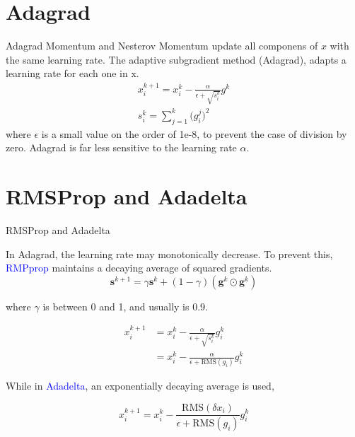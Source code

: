 \documentclass{beamer}
\begin{document}
\section{Adagrad}
\begin{frame}{Adagrad}
Momentum and Nesterov Momentum update all componens of $x$ with the same learning rate. The adaptive subgradient method (Adagrad), adapts a learning rate for each one in x.
\begin{gather*}
    x_i^{k+1} = x_i^k - \frac{\alpha}{\epsilon + \sqrt{s_i^k}} g^k \\
    s_i^k = \sum_{j=1}^k \bigg(g_i^j\bigg)^2 
\end{gather*}
where $\epsilon$ is a small value on the order of 1e-8, to prevent the case of division by zero. 
Adagrad is far less sensitive to the learning rate $\alpha$. 
\end{frame}

\section{RMSProp and Adadelta}
\begin{frame}{RMSProp and Adadelta}

In Adagrad, the learning rate may monotonically decrease. To prevent this, \textcolor{blue}{RMPprop} maintains a decaying average of squared gradients.
\begin{equation*}
    \boldsymbol{s}^{k+1} = \gamma \boldsymbol{s}^k + (1-\gamma)(\boldsymbol{g}^k \odot \boldsymbol{g}^k)
\end{equation*}

where $\gamma$ is between 0 and 1, and usually is 0.9.

\begin{equation*}
\begin{split}
    x_i^{k+1} &= x_i^k - \frac{\alpha}{\epsilon + \sqrt{s_i^k}} g_i^k \\
              &= x_i^k - \frac{\alpha}{\epsilon + \textrm{RMS}(g_i)} g_i^k        
\end{split}
\end{equation*}

While in \textcolor{blue}{Adadelta}, an exponentially decaying average is used,

\begin{equation*}
    x_i^{k+1} = x_i^k - \frac{\textrm{RMS}(\delta x_i)}{\epsilon + \textrm{RMS}(g_i)} g_i^k        
\end{equation*}

\end{frame}
\end{document}
